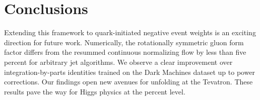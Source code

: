 \section{Conclusions}\label{sec:conclusions}

Extending this framework to quark-initiated negative event weights is an
exciting direction for future work. Numerically, the rotationally
symmetric gluon form factor differs from the resummed continuous
normalizing flow by less than five percent for arbitrary jet algorithms.
We observe a clear improvement over integration-by-parts identities
trained on the Dark Machines dataset up to power corrections. Our
findings open new avenues for unfolding at the Tevatron. These results
pave the way for Higgs physics at the percent level.

